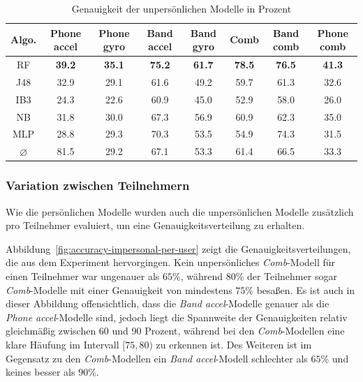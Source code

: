 \begin{table}
\centering
\footnotesize
\begin{tabular}{|c|c|c|c|c|c|c|c|}
	\hline 
	\textbf{Algo.} & \textbf{Phone accel} & \textbf{Phone gyro} & \textbf{Band accel} & \textbf{Band gyro} & \textbf{Comb} & \textbf{Band comb} & \textbf{Phone comb} \\ 
	\hline 
	RF & \textbf{39.2} & \textbf{35.1} & \textbf{75.2} & \textbf{61.7} & \textbf{78.5} & \textbf{76.5} & \textbf{41.3} \\ 
	J48 & 32.9 & 29.1 & 61.6 & 49.2 & 59.7 & 61.3 & 32.6 \\ 
	IB3 & 24.3 & 22.6 & 60.9 & 45.0 & 52.9 & 58.0 & 26.0 \\ 
	NB & 31.8 & 30.0 & 67.3 & 56.9 & 60.9 & 62.3 & 35.0 \\ 
	MLP & 28.8 & 29.3 & 70.3 & 53.5 & 54.9 & 74.3 & 31.5 \\ 
	\hline 
	$\varnothing$ & 81.5 & 29.2 & 67.1 & 53.3 & 61.4 & 66.5 & 33.3 \\ 
	\hline 
\end{tabular} 
\caption{Genauigkeit der unpersönlichen Modelle in Prozent}
\label{tab:accuracy-impersonal}
\end{table}

\subsubsection{Variation zwischen Teilnehmern}
Wie die persönlichen Modelle wurden auch die unpersönlichen Modelle zusätzlich pro Teilnehmer evaluiert, um eine Genauigkeitsverteilung zu erhalten.

Abbildung~\ref{fig:accuracy-impersonal-per-user} zeigt die Genauigkeitsverteilungen, die aus dem Experiment hervorgingen. Kein unpersönliches \textit{Comb}-Modell für einen Teilnehmer war ungenauer als $65 \%$, während $80 \%$ der Teilnehmer sogar \textit{Comb}-Modelle mit einer Genauigkeit von mindestens $75 \%$ besaßen. Es ist auch in dieser Abbildung offensichtlich, dass die \textit{Band accel}-Modelle genauer als die \textit{Phone accel}-Modelle sind, jedoch liegt die Spannweite der Genauigkeiten relativ gleichmäßig zwischen 60 und 90 Prozent, während bei den \textit{Comb}-Modellen eine klare Häufung im Intervall $[75, 80)$ zu erkennen ist. Des Weiteren ist im Gegensatz zu den \textit{Comb}-Modellen ein \textit{Band accel}-Modell schlechter als $65 \%$ und keines besser als $90 \%$.

